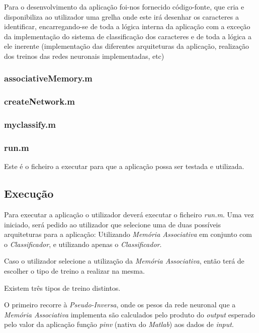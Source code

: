 \documentclass{article}
\begin{document}
Para o desenvolvimento da aplicação foi-nos fornecido código-fonte, que cria e disponibiliza ao utilizador uma grelha onde este irá desenhar os caracteres a identificar, encarregando-se de toda a lógica interna da aplicação com a exceção da implementação do sistema de classificação dos caracteres e de toda a lógica a ele inerente (implementação das diferentes arquiteturas da aplicação, realização dos treinos das redes neuronais implementadas, etc)

\subsubsection{associativeMemory.m}


\subsubsection{createNetwork.m}


\subsubsection{myclassify.m}


\subsubsection{run.m}

Este é o ficheiro a executar para que a aplicação possa ser testada e utilizada.

\pagebreak

\subsection{Execução}

Para executar a aplicação o utilizador deverá executar o ficheiro \emph{run.m}. Uma vez iniciado, será pedido ao utilizador que selecione uma de duas possíveis arquiteturas para a aplicação: Utilizando \emph{Memória Associativa} em conjunto com o \emph{Classificador}, e utilizando apenas o \emph{Classificador}.

Caso o utilizador selecione a utilização da \emph{Memória Associativa}, então terá de escolher o tipo de treino a realizar na mesma.

Existem três tipos de treino distintos.

O primeiro recorre à \emph{Pseudo-Inversa}, onde os pesos da rede neuronal que a \emph{Memória Associativa} implementa são calculados pelo produto do \emph{output} esperado pelo valor da aplicação função \emph{pinv} (nativa do \emph{Matlab}) aos dados de \emph{input}.
\end{document}
